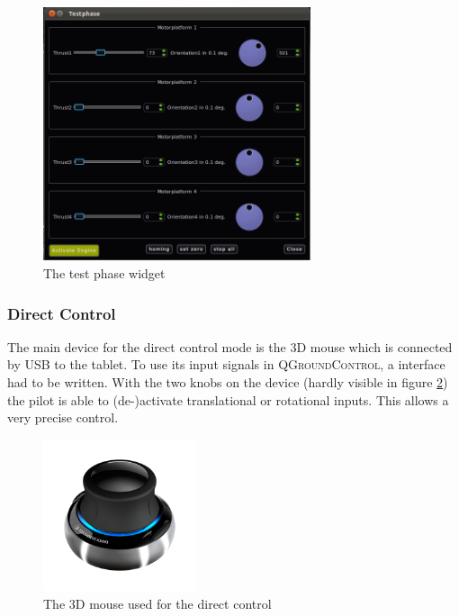 \begin{figure}[H] %
	\begin{center}
		\includegraphics[width=0.7\textwidth]{qgc_test_phase}
		\caption{The test phase widget }  
		\label{figure:qgc_test_phase}
	\end{center}
\end{figure}


\subsubsection{Direct Control}
The main device for the direct control mode is the 3D mouse which is connected by USB to the tablet. To use its input signals in  \textsc{QGroundControl}, a interface had to be written. With the two knobs on the device (hardly visible in figure \ref{fig:3D_mouse}) the pilot is able to (de-)activate translational or rotational inputs. This allows a very precise control.

\begin{figure}[H] %
	\begin{center}
		\includegraphics[width=0.4\textwidth]{3dx_productimage}
		\caption{The 3D mouse used for the direct control }  
		\label{fig:3D_mouse}
	\end{center}
\end{figure}

